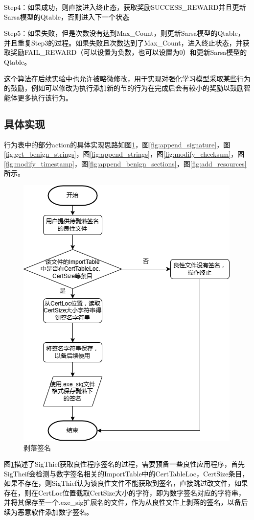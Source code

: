 \textcolor{black}{Step4：如果成功，则直接进入终止态，获取奖励SUCCESS\_REWARD并且更新Sarsa模型的Qtable，否则进入下一个状态}

\textcolor{black}{Step5：如果失败，但是次数没有达到Max\_Count，则更新Sarsa模型的Qtable，并且重复Step3的过程。如果失败且次数达到了Max\_Count，进入终止状态，并获取奖励FAIL\_REWARD（可以设置为负数，也可以设置为0）和更新Sarsa模型的Qtable。}

\textcolor{black}{这个算法在后续实验中也允许被略微修改，用于实现对强化学习模型采取某些行为的鼓励，例如可以修改为执行添加新的节的行为在完成后会有较小的奖励以鼓励智能体更多执行该行为。}

\subsection{具体实现}

\textcolor{black}{行为表中的部分action的具体实现思路如图\ref{fig:peel_signature}，图\ref{fig:append_signature}，图\ref{fig:get_benign_strings}，图\ref{fig:append_strings}，图\ref{fig:modify_checksum}，图\ref{fig:modify_timestamp}，图\ref{fig:append_benign_sections}，图\ref{fig:add_resources}所示。}

\begin{figure}[htbp]
  \centering
  \includegraphics[]{images/peel_signature.png}
  \caption{剥落签名}\label{fig:peel_signature}
\end{figure}
\textcolor{black}{图\ref{fig:peel_signature}描述了SigThief获取良性程序签名的过程，需要预备一些良性应用程序，首先SigTheif会检测与数字签名相关的ImportTable中的CertTableLoc，CertSize条目，如果不存在，则SigThief认为该良性文件不能获取到签名，直接跳过改文件，如果存在，则在CertLoc位置截取CertSize大小的字符，即为数字签名对应的字符串，并将其保存至一个.exe\_sig扩展名的文件，作为从良性文件上剥落的签名，以备后续为恶意软件添加数字签名。}

